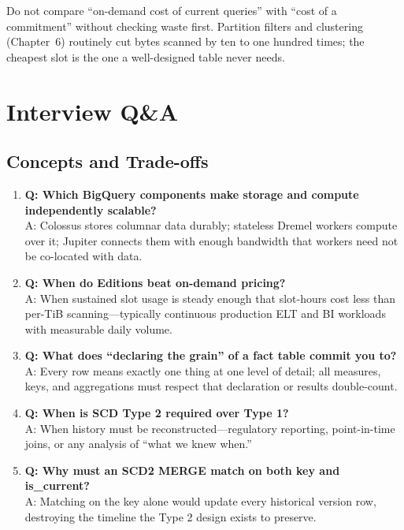 \begin{pitfall}
Do not compare ``on-demand cost of current queries'' with ``cost of a commitment'' without checking waste first. Partition filters and clustering (Chapter~6) routinely cut bytes scanned by ten to one hundred times; the cheapest slot is the one a well-designed table never needs.
\end{pitfall}

\section{Interview Q\&A}
\subsection{Concepts and Trade-offs}
\begin{enumerate}
    \item \textbf{Q: Which BigQuery components make storage and compute independently scalable?}\\
    A: Colossus stores columnar data durably; stateless Dremel workers compute over it; Jupiter connects them with enough bandwidth that workers need not be co-located with data.

    \item \textbf{Q: When do Editions beat on-demand pricing?}\\
    A: When sustained slot usage is steady enough that slot-hours cost less than per-TiB scanning---typically continuous production ELT and BI workloads with measurable daily volume.

    \item \textbf{Q: What does ``declaring the grain'' of a fact table commit you to?}\\
    A: Every row means exactly one thing at one level of detail; all measures, keys, and aggregations must respect that declaration or results double-count.

    \item \textbf{Q: When is SCD Type 2 required over Type 1?}\\
    A: When history must be reconstructed---regulatory reporting, point-in-time joins, or any analysis of ``what we knew when.''

    \item \textbf{Q: Why must an SCD2 MERGE match on both key and is\_current?}\\
    A: Matching on the key alone would update every historical version row, destroying the timeline the Type 2 design exists to preserve.
\end{enumerate}

